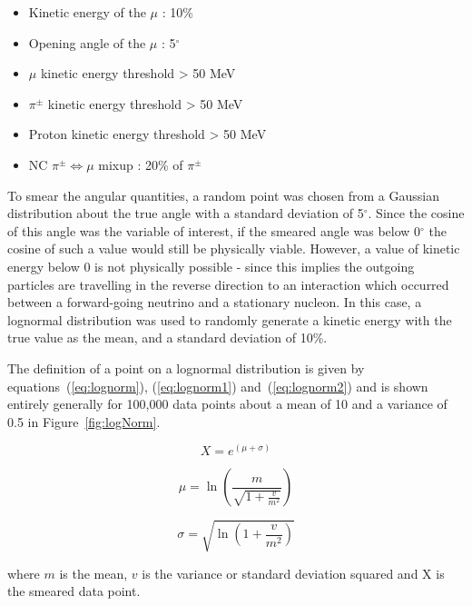 \begin{itemize}
    \setlength\itemsep{.5em}
    \item Kinetic energy of the \(\mu\) : 10\%
    \item Opening angle of the \(\mu\) : 5\(^{\circ}\)
    \item \(\mu\) kinetic energy threshold > 50 MeV
    \item \(\pi^{\pm}\) kinetic energy threshold > 50 MeV
    \item Proton kinetic energy threshold > 50 MeV
    \item NC \(\pi^{\pm} \Leftrightarrow \mu\) mixup : 20\% of \(\pi^{\pm}\)
\end{itemize}

To smear the angular quantities, a random point was chosen from a Gaussian distribution about the true angle with a standard deviation of 5\(^{\circ}\). Since the cosine of this angle was the variable of interest, if the smeared angle was below 0\(^{\circ}\) the cosine of such a value would still be physically viable. However, a value of kinetic energy below 0 is not physically possible - since this implies the outgoing particles are travelling in the reverse direction to an interaction which occurred between a forward-going neutrino and a stationary nucleon. In this case, a lognormal distribution was used to randomly generate a kinetic energy with the true value as the mean, and a standard deviation of 10\%. 

The definition of a point on a lognormal distribution is given by equations~(\ref{eq:lognorm}), (\ref{eq:lognorm1}) and~(\ref{eq:lognorm2}) and is shown entirely generally for 100,000 data points about a mean of 10 and a variance of 0.5 in Figure~\ref{fig:logNorm}.

    \begin{equation}\label{eq:lognorm}
        X = e^{(\mu + \sigma)}
    \end{equation}

    \begin{equation}\label{eq:lognorm1}
        \mu = \ln \left( \frac{m}{\sqrt{1 + \frac{v}{m^2}}} \right)
    \end{equation}

    \begin{equation}\label{eq:lognorm2}
        \sigma = \sqrt{\ln \left( 1 + \frac{v}{m^2} \right) }
    \end{equation}
    
    where \( m \) is the mean, \( v \) is the variance or standard deviation squared and X is the smeared data point.   


